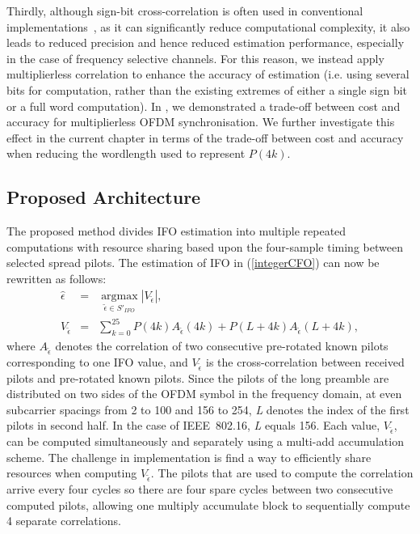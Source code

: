 Thirdly, although sign-bit cross-correlation is often used in conventional implementations~\cite{Kim2008,Schwoerer2002}, as it can significantly reduce computational complexity, it also leads to reduced precision and hence reduced estimation performance, especially in the case of frequency selective channels.
For this reason, we instead apply multiplierless correlation to enhance the accuracy of estimation (i.e. using several bits for computation, rather than the existing extremes of either a single sign bit or a full word computation).
In \cite{Pham2012}, we demonstrated a trade-off between cost and accuracy for multiplierless OFDM synchronisation.
We further investigate this effect in the current chapter in terms of the trade-off between cost and accuracy when reducing the wordlength used to represent $P(4k)$.

\subsection{Proposed Architecture}
\label{subsec:Imple}
The proposed method divides IFO estimation into multiple repeated computations with resource sharing based upon the four-sample timing between selected spread pilots.
The estimation of IFO in (\ref{integerCFO}) can now be rewritten as follows:
\begin{eqnarray}
\label{proposedimplementIFO}
\hat{\epsilon}  &=&\underset{\tilde{\epsilon} \in S'_{IFO}}{\operatorname{argmax}}  \left|V_{\tilde{\epsilon}}  \right|,	 \nonumber \\
V_{\tilde{\epsilon}} &=& \sum_{k=0}^{25} P(4k) A_{\tilde{\epsilon}}(4k) + P(L+4k)  A_{\tilde{\epsilon}}(L+4k),
\end{eqnarray}
where $A_{\tilde{\epsilon}}$ denotes the correlation of two consecutive pre-rotated known pilots corresponding to one IFO value, and $V_{\tilde{\epsilon}}$ is the cross-correlation between received pilots and pre-rotated known pilots.
Since the pilots of the long preamble are distributed on two sides of the OFDM symbol in the frequency domain, at even subcarrier spacings from 2 to 100 and 156 to 254, \emph{L} denotes the index of the first pilots in second half.
In the case of IEEE~802.16, \emph{L} equals 156.
Each value, $V_{\tilde{\epsilon}}$, can be computed simultaneously and separately using a multi-add accumulation scheme.
The challenge in implementation is find a way to efficiently share resources when computing $V_{\tilde{\epsilon}}$.
The pilots that are used to compute the correlation arrive every four cycles so there are four spare cycles between two consecutive computed pilots, allowing one multiply accumulate block to sequentially compute 4 separate correlations.

